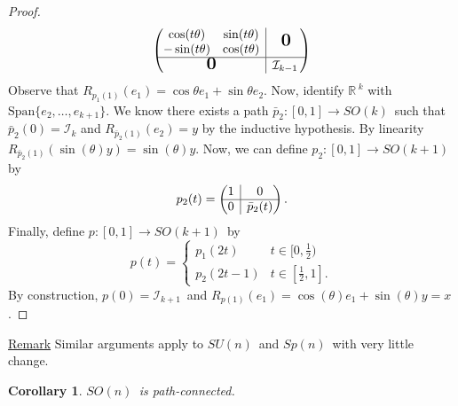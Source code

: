 \documentclass[12pt,a4paper]{article}
\newcommand{\rR}{\ensuremath{\mathbb{R}\,}}
\newcommand{\gspk}[1]{\ensuremath{Sp(#1)\,}}
\newcommand{\gsok}[1]{\ensuremath{SO(#1)\,}}
\newcommand{\gsuk}[1]{\ensuremath{SU(#1)\,}}
\newcommand{\ci}[1]{\ensuremath{\mathcal{I}_{#1}\,}}
\newcommand{\ul}[1]{\underline{#1}}
\newtheorem{cor}[thm]{Corollary}
\newcommand{\rvline}{\hspace*{-\arraycolsep}\vline\hspace*{-\arraycolsep}}
\newcommand{\bigzero}{\mbox{\normalfont\Large\bfseries 0}}
\begin{document}
\begin{proof}
\[
\begin{pmatrix}
  \begin{matrix}
  \cos(t\theta) & \sin(t\theta)  \\
  -\sin(t\theta) &   \cos(t\theta)
  \end{matrix}
  & \rvline & \bigzero
  \\
\hline

  \bigzero & \rvline &
  \ci{k-1}
\end{pmatrix}
\]
Observe that $R_{p_1(1)}(e_1) = \cos\theta e_1 + \sin\theta e_2$. Now, identify $\rR^k$ with $\mbox{Span}\{e_2, \hdots, e_{k+1}\}$. We know there exists a path $\bar{p}_2 : [0, 1] \to \gsok{k}$ such that $\bar{p}_2(0) = \mathcal{I}_k$ and $R_{\bar{p}_2(1)}(e_2) = y$ by the inductive hypothesis. By linearity $R_{\bar{p}_2(1)}(\sin(\theta) y) = \sin(\theta) y$. Now, we can define $p_2:[0, 1] \to \gsok{k+1}$ by
\[
p_2(t) =
\begin{pmatrix}
  1 & \rvline & 0
  \\
\hline

  0 & \rvline & \bar{p}_2(t)
\end{pmatrix}.
\]
Finally, define $p:[0, 1] \to \gsok{k+1}$ by
\[
p(t) =
\begin{cases}
p_1(2t)   & t \in  [0, \frac{1}{2}) \\
p_2(2t-1) & t \in  [\frac{1}{2}, 1].
\end{cases}
\]
By construction, $p(0) = \ci{k+1}$ and $R_{p(1)}(e_1) = \cos(\theta)e_1 + \sin(\theta)y = x$.
\end{proof}

\ul{Remark} Similar arguments apply to \gsuk{n} and \gspk{n} with very little change.

\begin{cor}
\gsok{n} is path-connected.
\end{cor}
\end{document}
